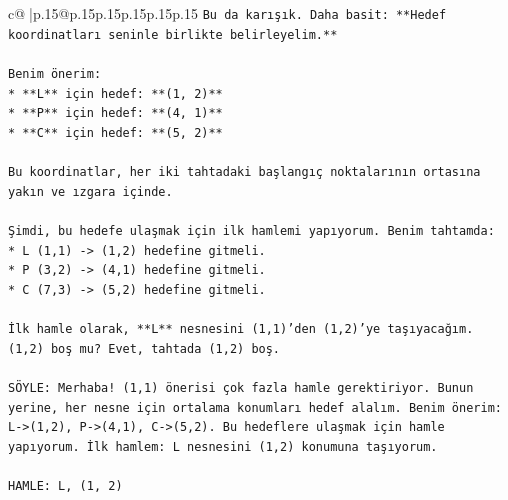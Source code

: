 \documentclass{article}
\begin{document}
{\begin{supertabular}{c@{$\;$}|p{.15\linewidth}@{}p{.15\linewidth}p{.15\linewidth}p{.15\linewidth}p{.15\linewidth}p{.15\linewidth}}
{{{\texttt{Bu da karışık. Daha basit: **Hedef koordinatları seninle birlikte belirleyelim.**} \\
\\ 
\texttt{Benim önerim:} \\
\texttt{*   **L** için hedef: **(1, 2)**} \\
\texttt{*   **P** için hedef: **(4, 1)**} \\
\texttt{*   **C** için hedef: **(5, 2)**} \\
\\ 
\texttt{Bu koordinatlar, her iki tahtadaki başlangıç noktalarının ortasına yakın ve ızgara içinde.} \\
\\ 
\texttt{Şimdi, bu hedefe ulaşmak için ilk hamlemi yapıyorum. Benim tahtamda:} \\
\texttt{*   L (1,1) {-}> (1,2) hedefine gitmeli.} \\
\texttt{*   P (3,2) {-}> (4,1) hedefine gitmeli.} \\
\texttt{*   C (7,3) {-}> (5,2) hedefine gitmeli.} \\
\\ 
\texttt{İlk hamle olarak, **L** nesnesini (1,1)'den (1,2)'ye taşıyacağım. (1,2) boş mu? Evet, tahtada (1,2) boş.} \\
\\ 
\texttt{SÖYLE: Merhaba! (1,1) önerisi çok fazla hamle gerektiriyor. Bunun yerine, her nesne için ortalama konumları hedef alalım. Benim önerim: L{-}>(1,2), P{-}>(4,1), C{-}>(5,2). Bu hedeflere ulaşmak için hamle yapıyorum. İlk hamlem: L nesnesini (1,2) konumuna taşıyorum.} \\
\\ 
\texttt{HAMLE: L, (1, 2)} \\
            }
        }
    }
     \\ \\


\end{supertabular}}
\end{document}
